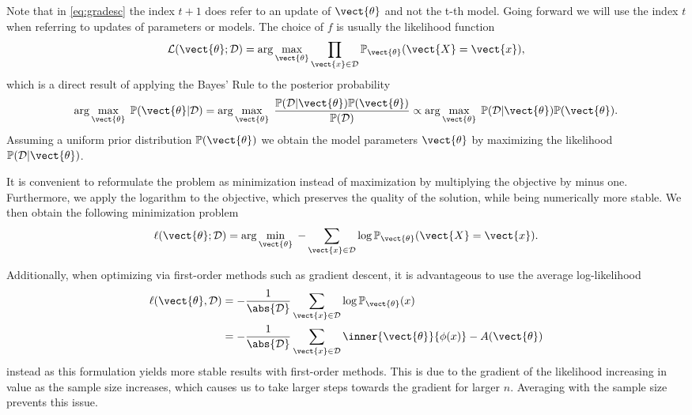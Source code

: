     Note that in \eq\ref{eq:gradesc} the index $t+1$ does refer to an update of $\vect{\theta}$ and not the t-th model.
    Going forward we will use the index $t$ when referring to updates of parameters or models. 
    The choice of $f$ is usually the likelihood function
    \begin{equation}
        \label{eq:likelihood}
        \mathcal{L}(\vect{\theta} ; \mathcal{D}) = \arg\max_{\vect{\theta}}\prod_{\vect{x} \in \mathcal{D}}  \mathbb{P}_{\vect{\theta}}(\vect{X} = \vect{x}),
    \end{equation}
    which is a direct result of applying the Bayes' Rule to the posterior probability
    \begin{equation}
        \arg\max_{\vect{\theta}} \; \mathbb{P}(\vect{\theta} \lvert \mathcal{D}) = \arg\max_{\vect{\theta}} \; \frac{\mathbb{P}(\mathcal{D} \lvert \vect{\theta}) \mathbb{P}(\vect{\theta})}{\mathbb{P}(\mathcal{D})} \propto   \arg\max_{\vect{\theta}} \; \mathbb{P}(\mathcal{D} \lvert \vect{\theta}) \mathbb{P}(\vect{\theta}).
    \end{equation}
    Assuming a uniform prior distribution $\mathbb{P}(\vect{\theta})$ we obtain the model parameters $\vect{\theta}$ by maximizing the likelihood $\mathbb{P}(\mathcal{D} \lvert \vect{\theta})$.

    It is convenient to reformulate the problem as minimization instead of  maximization by multiplying the objective by minus one. 
    Furthermore, we apply the logarithm to the objective, which preserves the quality of the solution, while being numerically more stable.
    We then obtain the following minimization problem
    \begin{equation}
        \label{eq:likelihood:log}
        \ell(\vect{\theta} ; \mathcal{D}) = \arg\min_{\vect{\theta}} \; - \sum_{\vect{x} \in \mathcal{D}}  \log \mathbb{P}_{\vect{\theta}}(\vect{X} = \vect{x}).
    \end{equation}

    Additionally, when optimizing via first-order methods such as gradient descent, it is advantageous to use the average log-likelihood
    \begin{equation}
        \label{eq:likelihood:expfam}
        \begin{split}
        \ell(\vect{\theta}, \mathcal{D}) &= - \frac{1}{\abs{\mathcal{D}}} \sum_{\vect{x} \in \mathcal{D}} \log \mathbb{P}_{\vect{\theta}}(x)\\
        &= - \frac{1}{\abs{\mathcal{D}}} \sum_{\vect{x} \in \mathcal{D}} \inner{\vect{\theta}}{\phi(x)} - A(\vect{\theta})
    \end{split}
    \end{equation}
    instead as this formulation yields more stable results with first-order methods.
    This is due to the gradient of the likelihood increasing in value as the sample size increases, which causes us to take larger steps towards the gradient for larger $n$.
    Averaging with the sample size prevents this issue.

